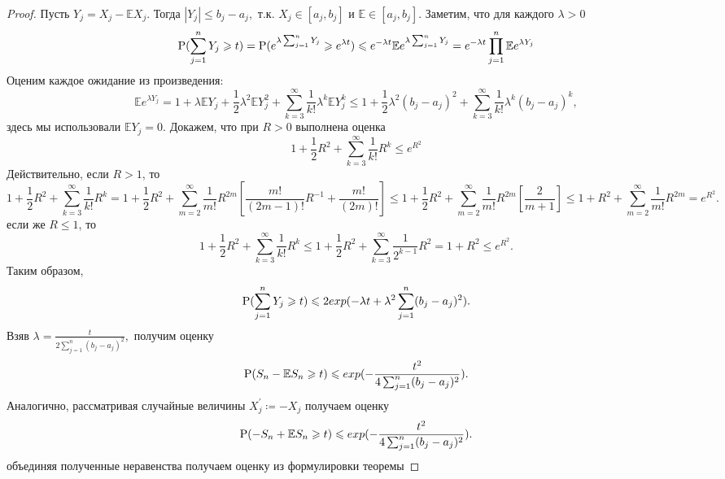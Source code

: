 \begin{proof}
    Пусть $Y_j = X_j - \mathbb{E}X_j.$ Тогда $|Y_j|\leq b_j - a_j,$ т.к. $X_j\in[a_j, b_j]$ и $\mathbb{E}\in[a_j, b_j].$ Заметим, что для каждого $\lambda > 0$
    \begin{equation*}
        \P(\sum\limits_{j=1}^{n}Y_j \geq t) = \P(e^{\lambda\sum_{j=1}^{n}Y_j} \geq e^{\lambda t}) \leq e^{-\lambda t}\mathbb{E}e^{\lambda\sum_{j=1}^{n} Y_j} = e^{-\lambda t}\prod_{j=1}^{n}\mathbb{E}e^{\lambda Y_j}
    \end{equation*}
    Оценим каждое ожидание из произведения:
    \begin{equation*}
        \mathbb{E}e^{\lambda Y_j} = 1 + \lambda\mathbb{E}Y_j + \frac{1}{2}\lambda^{2}\mathbb{E}Y_{j}^{2} + \sum\limits_{k = 3}^{\infty}\frac{1}{k!}\lambda^{k}\mathbb{E}Y_{j}^{k} \leq 1 + \frac{1}{2}\lambda^{2}(b_j - a_j)^{2} + \sum\limits_{k=3}^{\infty}\frac{1}{k!}\lambda^{k}(b_j - a_j)^{k}, 
    \end{equation*}
    здесь мы использовали $\mathbb{E}Y_j = 0.$ Докажем, что при $R > 0$ выполнена оценка
    \begin{equation*}
        1 + \frac{1}{2}R^2 + \sum\limits_{k=3}^{\infty}\frac{1}{k!}R^k \leq e^{R^2}
    \end{equation*}
    Действительно, если $R > 1$, то
    \begin{equation*}
        1 + \frac{1}{2}R^2 + \sum\limits_{k=3}^{\infty}\frac{1}{k!}R^k = 1 + \frac{1}{2}R^2 + \sum\limits_{m=2}^{\infty}\frac{1}{m!}R^{2m}[\frac{m!}{(2m - 1)!}R^{-1} + \frac{m!}{(2m)!}] \leq 1 + \frac{1}{2}R^2 + \sum\limits_{m=2}^{\infty}\frac{1}{m!}R^{2m}[\frac{2}{m + 1}] \leq 1 + R^2 + \sum\limits_{m=2}^{\infty}\frac{1}{m!}R^{2m} = e^{R^2}.
    \end{equation*}
    если же $R\leq 1$, то
    \begin{equation*}
        1 + \frac{1}{2}R^2 + \sum\limits_{k=3}^{\infty}\frac{1}{k!}R^k \leq 1 + \frac{1}{2}R^2+ \sum\limits_{k=3}^{\infty}\frac{1}{2^{k-1}}R^2 = 1 + R^2 \leq e^{R^2}.
    \end{equation*}
    Таким образом,
    \begin{equation*}
        \P(\sum\limits_{j=1}^{n}Y_j\geq t)\leq 2 exp(-\lambda t + \lambda^2\sum\limits_{j=1}^{n}(b_j - a_j)^2).
    \end{equation*}
    Взяв $\lambda = \frac{t}{2\sum_{j=1}^{n}(b_j - a_j)^2},$ получим оценку
    \begin{equation*}
        \P(S_n - \mathbb{E}S_n \geq t)\leq exp(-\frac{t^2}{4\sum_{j=1}^{n}(b_j - a_j)^2}).
    \end{equation*}
    Аналогично, рассматривая случайные величины $X_{j}^{'} \coloneqq -X_j$ получаем оценку
    \begin{equation*}
        \P(-S_n + \mathbb{E}S_n \geq t) \leq exp(-\frac{t^2}{4\sum_{j=1}^{n}(b_j - a_j)^2}).
    \end{equation*}
    объединяя полученные неравенства получаем оценку из формулировки теоремы
\end{proof}

